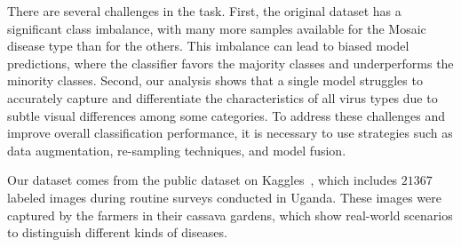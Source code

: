 There are several challenges in the task. First, the original dataset has a significant class imbalance, with many more samples available for the Mosaic disease type than for the others. This imbalance can lead to biased model predictions, where the classifier favors the majority classes and underperforms the minority classes. Second, our analysis shows that a single model struggles to accurately capture and differentiate the characteristics of all virus types due to subtle visual differences among some categories. To address these challenges and improve overall classification performance, it is necessary to use strategies such as data augmentation, re-sampling techniques, and model fusion.

Our dataset comes from the public dataset on Kaggles~\cite{cassava-leaf-disease-classification}, which includes $21367$ labeled images during routine surveys conducted in Uganda. These images were captured by the farmers in their cassava gardens, which show real-world scenarios to distinguish different kinds of diseases.
